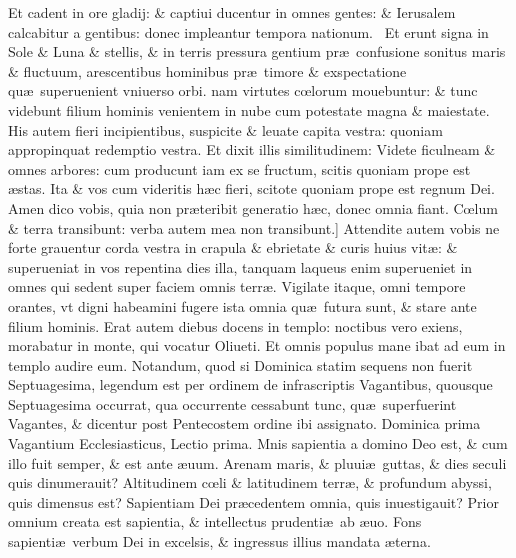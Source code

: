 \documentclass[a5paper,10pt]{book}
\def\leftmarginnote{%
	\lrmarginnote{\hskip -\marginparsep \hskip -6.5em}}
\def\rightmarginnote{%
	\lrmarginnote{\hskip\columnwidth \hskip -1em}}
\def\ae{æ}
\def\oe{œ}
\begin{document}
\begin{multicols*}{2}
Et cadent in ore gladij: \& captiui ducentur in omnes gentes: \& Ierusalem calcabitur a gentibus: donec impleantur tempora nationum. \textdagger \ 
Et\rightmarginnote{E} erunt signa in Sole \& Luna \& stellis, \& in terris pressura gentium pr\ae \ confusione sonitus maris \& fluctuum, arescentibus hominibus pr\ae \ timore \& exspectatione qu\ae \ superuenient
vniuerso orbi. nam virtutes c\oe lorum mouebuntur: \& tunc videbunt filium hominis venientem in nube cum potestate magna \& maiestate.
His autem fieri incipientibus, suspicite \& leuate capita vestra: quoniam appropinquat redemptio vestra.
Et\rightmarginnote{F} dixit illis similitudinem: Videte ficulneam \& omnes arbores: cum producunt iam ex se fructum, scitis quoniam prope est \ae stas.
Ita \& vos cum videritis h\ae c fieri, scitote quoniam prope est regnum Dei. Amen dico vobis, quia non pr\ae teribit generatio h\ae c, donec omnia fiant.
C\oe lum \& terra transibunt: verba autem mea non\rightmarginnote{G} transibunt.]
Attendite autem vobis ne forte grauentur corda vestra in crapula \& ebrietate \& curis huius vit\ae : \& superueniat in vos repentina dies illa, tanquam laqueus enim superueniet in omnes qui sedent super faciem omnis terr\ae .
Vigilate itaque, omni tempore orantes, vt digni habeamini fugere ista omnia qu\ae \ futura sunt, \& stare ante filium hominis.
Erat autem diebus docens in templo: noctibus vero exiens, morabatur in monte, qui vocatur Oliueti. Et omnis populus mane ibat ad eum in templo audire eum.
\newline {} \color{red} Notandum, quod si Dominica statim sequens non fuerit Septuagesima, legendum est per ordinem de infrascriptis Vagantibus, quousque Septuagesima occurrat, qua occurrente cessabunt tunc, qu\ae \ superfuerint Vagantes, \& dicentur post Pentecostem ordine ibi assignato. \color{black}
\newline \textswab{C} \color{red} \hypertarget{SUN-PRIMA-VAGAN}{Dominica prima} Vagantium Ecclesiasticus, \quad Lectio prima. \color{black}
\bookmark[rellevel=-1,dest=SUN-PRIMA-VAGAN]{DOMINICA PRIMA VAGANTIVM}
\vspace{-1.25em}
Mnis\leftmarginnote{\begin{flushright}ca. 1.\end{flushright}} sapientia a domino Deo est, \& cum illo fuit semper, \& est ante \ae uum.
Arenam maris, \& pluui\ae \ guttas, \& dies seculi quis dinumerauit? Altitudinem c\oe li \& latitudinem terr\ae , \& profundum abyssi, quis dimensus est?
Sapientiam Dei pr\ae cedentem omnia, quis inuestigauit? Prior omnium creata est sapientia, \& intellectus prudenti\ae \ ab \ae uo. Fons sapienti\ae \ verbum Dei in excelsis, \& ingressus illius mandata \ae terna.

\end{multicols*}
\end{document}
